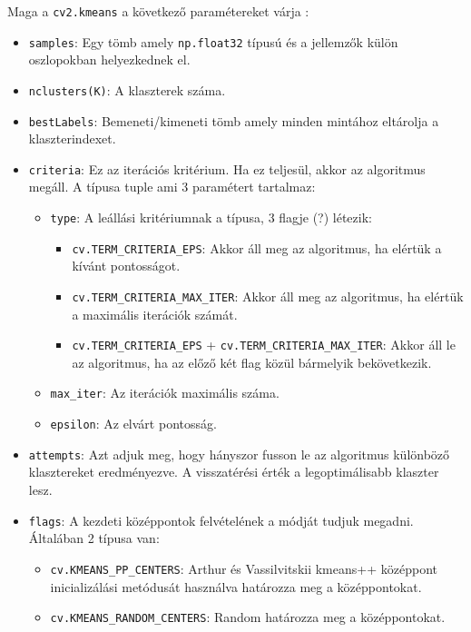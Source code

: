 Maga a \texttt{cv2.kmeans} a következő paramétereket várja \cite{kmeans_opencv}:
\begin{itemize}
\item \texttt{samples}: Egy tömb amely \texttt{np.float32} típusú és a jellemzők külön oszlopokban helyezkednek el.
\item \texttt{nclusters(K)}: A klaszterek száma.
\item \texttt{bestLabels}: Bemeneti/kimeneti tömb amely minden mintához eltárolja a klaszterindexet.
\item \texttt{criteria}: Ez az iterációs kritérium. Ha ez teljesül, akkor az algoritmus megáll. A típusa tuple ami 3 paramétert tartalmaz:
    \begin{itemize}
    \item \texttt{type}: A leállási kritériumnak a típusa, 3 flagje (?) létezik:
        \begin{itemize}
        \item \texttt{cv.TERM\_CRITERIA\_EPS}: Akkor áll meg az algoritmus, ha elértük a kívánt pontosságot.
        \item \texttt{cv.TERM\_CRITERIA\_MAX\_ITER}: Akkor áll meg az algoritmus, ha elértük a maximális iterációk számát.
        \item \texttt{cv.TERM\_CRITERIA\_EPS} + \texttt{cv.TERM\_CRITERIA\_MAX\_ITER}: Akkor áll le az algoritmus, ha az előző két flag közül bármelyik bekövetkezik.
        \end{itemize}
    \item \texttt{max\_iter}: Az iterációk maximális száma.
    \item \texttt{epsilon}: Az elvárt pontosság.
    \end{itemize}
\item \texttt{attempts}: Azt adjuk meg, hogy hányszor fusson le az algoritmus különböző klasztereket eredményezve. A visszatérési érték a legoptimálisabb klaszter lesz.
\item \texttt{flags}: A kezdeti középpontok felvételének a módját tudjuk megadni. Általában 2 típusa van:
    \begin{itemize}
    \item \texttt{cv.KMEANS\_PP\_CENTERS}: Arthur és Vassilvitskii kmeans++ középpont inicializálási metódusát használva határozza meg a középpontokat.
    \item \texttt{cv.KMEANS\_RANDOM\_CENTERS}: Random határozza meg a középpontokat.
    \end{itemize}
\end{itemize}

